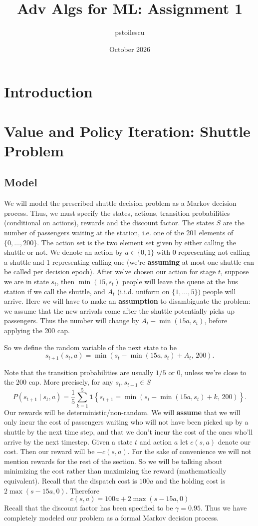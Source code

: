 \documentclass{article}
\title{Adv Algs for ML: Assignment 1}
\author{pstoilescu}
\date{October 2026}
\begin{document}
\maketitle

\section{Introduction}

\section{Value and Policy Iteration: Shuttle Problem}
\subsection{Model}
We will model the prescribed shuttle decision problem as a Markov decision process. Thus, we must specify the states, actions, transition probabilities (conditional on actions), rewards and the discount factor. The states $S$ are the number of passengers waiting at the station, i.e. one of the 201 elements of $\{0,\ldots,200\}$. The action set is the two element set given by either calling the shuttle or not. We denote an action by $a\in \{0,1\}$ with 0 representing not calling a shuttle and 1 representing calling one (we're \textbf{assuming} at most one shuttle can be called per decision epoch). After we've chosen our action for stage $t$, suppose we are in state $s_t$, then $\min(15,s_t)$ people will leave the queue at the bus station if we call the shuttle, and $A_t$ (i.i.d. uniform on $\{1,\ldots,5\}$) people will arrive. Here we will have to make an \textbf{assumption} to disambiguate the problem: we assume that the new arrivals come after the shuttle potentially picks up passengers. Thus the number will change by $A_t-\min(15a,s_t)$, before applying the 200 cap.

So we define the random variable of the next state to be
\[
s_{t+1}(s_t,a)
=
\min\left(s_t-\min(15a,s_t)+A_t,\,200\right).
\]

Note that the transition probabilities are usually $1/5$ or $0$, unless we're close to the 200 cap.
More precisely, for any $s_t, s_{t+1}\in S$
\[
P(s_{t+1}\mid s_t,a)
=
\frac{1}{5}
\sum_{k=1}^{5}
\mathbf{1}
\left\{
s_{t+1}
=
\min\left(s_t-\min(15a,s_t)+k,\,200\right)
\right\}.
\]
Our rewards will be deterministic/non-random. We will \textbf{assume} that we will only incur the cost of passengers waiting who will not have been picked up by a shuttle by the next time step, and that we don't incur the cost of the ones who'll arrive by the next timestep. Given a state $t$ and action $a$ let $c(s,a)$ denote our cost. Then our reward will be $-c(s,a)$. For the sake of convenience we will not mention rewards for the rest of the section. So we will be talking about minimizing the cost rather than maximizing the reward (mathematically equivalent). Recall that the dispatch cost is $100a$ and the holding cost is $2\max(s-15a,0)$. Therefore
\[c(s,a) = 100a + 2\max(s-15a,0) \]
Recall that the discount factor has been specified to be $\gamma = 0.95$. Thus we have completely modeled our problem as a formal Markov decision process.
\end{document}
